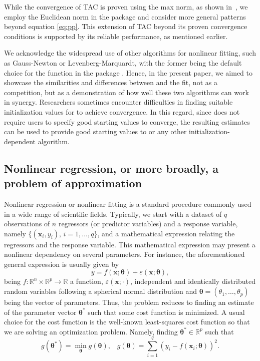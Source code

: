 While the convergence of TAC is proven using the max norm, as shown in~\citet{tac}, we employ the Euclidean norm in the  package and consider more general patterns beyond equation \eqref{eq:pp}. This extension of TAC beyond its proven convergence conditions is supported by its reliable performance, as mentioned earlier.


We acknowledge the widespread use of other algorithms for nonlinear fitting, such as Gauss-Newton or Levenberg-Marquardt, with the former being the default choice for the  function in the  package \citep{R}. Hence, in the present paper, we aimed to showcase the similarities and differences between  and the  fit, not as a competition, but as a demonstration of how well these two algorithms can work in synergy. Researchers sometimes encounter difficulties in finding suitable initialization values for  to achieve convergence. In this regard, since  does not require users to specify good starting values to converge, the resulting estimates can be used to provide good starting values to  or any other initialization-dependent algorithm.









\subsection{Nonlinear regression, or more broadly, a problem of approximation}
Nonlinear regression or nonlinear fitting is a standard procedure commonly used in a wide range of scientific fields. Typically, we start with a dataset of $q$ observations of $n$ regressors (or predictor variables) and a response variable, namely $\{(\mathbf{x}_i, y_i),\, i = 1,\ldots,q\}$, and a mathematical expression relating the regressors  and the response variable. This mathematical expression may present a nonlinear dependency on several parameters. For instance, the aforementioned general expression is usually given by
\begin{equation}\label{eq:fullnonlinear}
    y = f(\mathbf{x};\boldsymbol\theta) + \varepsilon(\mathbf{x};\boldsymbol\theta),
\end{equation}
being $f:\mathbb{R}^n\times\mathbb{R}^p\rightarrow \mathbb{R}$ a function,  $\varepsilon(\mathbf{x};\cdot)$, independent and identically distributed random variables following a spherical normal distribution and  $\boldsymbol\theta = (\theta_1,\ldots,\theta_p)$ being the vector of parameters.
Thus, the problem reduces to finding an estimate of the parameter vector $\boldsymbol\theta^*$ such that some cost function is minimized. A usual choice for the cost function is the well-known least-squares cost function so that we are solving an optimization problem. Namely, finding $\boldsymbol\theta^* \in \mathbb{R}^p$ such that
\begin{equation}\label{eq:optimization}
    g(\boldsymbol\theta^*)=\min_{\boldsymbol{\theta}} g(\boldsymbol{\theta}), \;\;\; g(\boldsymbol{\theta})=\sum_{i = 1}^q\left(y_i-f(\mathbf{x}_i;\boldsymbol\theta)\right)^2.
\end{equation}

